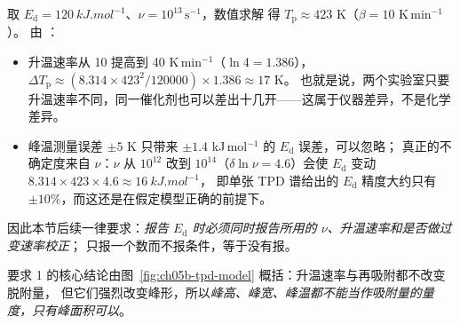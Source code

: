 \begin{measure}
取 $E_{\mathrm d}=\qty{120}{kJ.mol^{-1}}$、$\nu=10^{13}\,\mathrm{s^{-1}}$，数值求解
 得 $T_{\mathrm p}\approx 423$ K（$\beta=10$ K\,min$^{-1}$）。
由 ：

\begin{itemize}
  \item 升温速率从 10 提高到 40 K\,min$^{-1}$（$\ln 4=1.386$），
        $\Delta T_{\mathrm p}\approx(8.314\times423^{2}/120000)\times1.386\approx 17$ K。
        也就是说，两个实验室只要升温速率不同，同一催化剂也可以差出十几开——这属于仪器差异，不是化学差异。
  \item 峰温测量误差 $\pm5$ K 只带来 $\pm1.4$ kJ\,mol$^{-1}$ 的 $E_{\mathrm d}$ 误差，可以忽略；
        真正的不确定度来自 $\nu$：$\nu$ 从 $10^{12}$ 改到 $10^{14}$（$\delta\ln\nu=4.6$）会使
        $E_{\mathrm d}$ 变动 $8.314\times423\times4.6\approx\qty{16}{kJ.mol^{-1}}$，
        即单张 TPD 谱给出的 $E_{\mathrm d}$ 精度大约只有 $\pm10\%$，而这还是在假定模型正确的前提下。
\end{itemize}

因此本节后续一律要求：\emph{报告 $E_{\mathrm d}$ 时必须同时报告所用的 $\nu$、升温速率和是否做过变速率校正}；
只报一个数而不报条件，等于没有报。
\end{measure}

要求 1 的核心结论由图~\ref{fig:ch05b-tpd-model} 概括：升温速率与再吸附都不改变脱附量，
但它们强烈改变峰形，所以\emph{峰高、峰宽、峰温都不能当作吸附量的量度，只有峰面积可以}。


